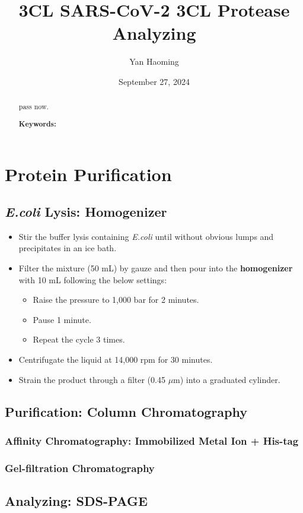\documentclass{report}
\title{3CL SARS-CoV-2 3CL Protease Analyzing}
\author{Yan Haoming}
\date{September 27, 2024}
\begin{document}
\maketitle
\begin{abstract}
    pass now.

\textbf{Keywords: }
\end{abstract}

\chapter{Protein Purification}
\section{\textit{E.coli} Lysis: Homogenizer}
\begin{itemize}
    \item Stir the buffer lysis containing \textit{E.coli} until without obvious lumps and precipitates in an ice bath.
    \item Filter the mixture (50 mL) by gauze and then pour into the \textbf{homogenizer}\cite{Homogenization} with 10 mL  following the below settings:
    \begin{itemize}
        \item Raise the pressure to 1,000 bar for 2 minutes.
        \item Pause 1 minute.
        \item Repeat the cycle 3 times.
    \end{itemize}
    \item Centrifugate the liquid at 14,000 rpm for 30 minutes.
    \item Strain the product through a filter (0.45 $\mu$m) into a graduated cylinder.
\end{itemize}
\section{Purification: Column Chromatography}
\subsection{Affinity Chromatography: Immobilized  Metal Ion + His-tag}
\subsection{Gel-filtration Chromatography}
\section{Analyzing: SDS-PAGE}
\end{document}
